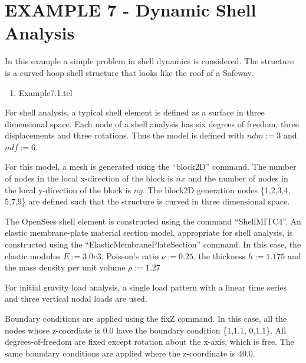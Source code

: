 \documentclass[12pt]{article}
\begin{document}
\clearpage
\section {EXAMPLE 7 - Dynamic Shell Analysis}

In this example a simple problem in shell dynamics is considered.
The structure is a curved hoop shell structure that looks like the 
roof of a Safeway.

\vspace{0.2in}  
\begin{enumerate} 
\item Example7.1.tcl
\end{enumerate}

\vspace{0.2in} 

For shell analysis, a typical shell element is defined as a surface in
three dimensional space.  Each node of a shell analysis has six degrees of freedom, 
three displacements and three rotations.  Thus the model is defined with 
$ndm := 3$ and $ndf := 6$.

For this model, a mesh is generated using the ``block2D'' command.  The number of 
nodes in the local x-direction of the block is $nx$ and
the number of 
nodes in the local y-direction of the block is $ny$.
The block2D generation nodes \{1,2,3,4, 5,7,9\}
 are defined such that the structure is curved
in three dimensional space.

The OpenSees shell element is constructed using the command ``ShellMITC4''.
An elastic membrane-plate material section model, appropriate for shell analysis, is 
constructed using the ``ElasticMembranePlateSection'' command.
In this case, the elastic modulus $E := 3.0e3$, Poisson's ratio
$\nu :=  0.25$, 
the thickness $h := 1.175$ and
the mass density per unit volume $\rho := 1.27$

For initial gravity load analysis, a single load pattern 
with a linear time series and three vertical nodal loads are used. 

Boundary conditions are applied using the fixZ command.  In this case, 
all the nodes whose z-coordiate is $0.0$ have the boundary condition
\{1,1,1, 0,1,1\}.  All degrees-of-freedom are fixed except rotation 
about the x-axis, which is free. 
The same boundary conditions are applied where the
z-coordinate is $40.0$.


\vspace{0.2in}
\end{document}
